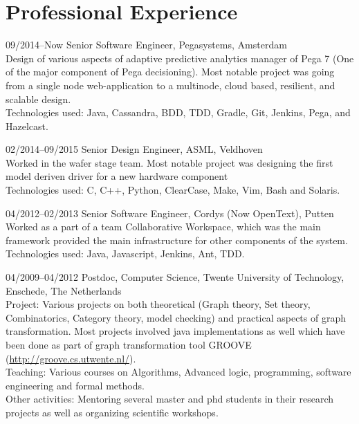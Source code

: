 \section{Professional Experience}

\begin{CV}
\item[09/2014--Now] Senior Software Engineer, Pegasystems, Amsterdam \\
Design of various aspects of adaptive predictive analytics manager of Pega 7 (One of the major component of Pega decisioning). Most notable project was going from a single node web-application to a multinode, cloud based, resilient, and scalable design. \\
Technologies used: Java, Cassandra, BDD, TDD, Gradle, Git, Jenkins, Pega, and Hazelcast.

\item[02/2014--09/2015] Senior Design Engineer, ASML, Veldhoven \\
Worked in the wafer stage team. Most notable project was designing the first model deriven driver for a new hardware component \\
Technologies used: C, C++, Python, ClearCase, Make, Vim, Bash and Solaris.

\item[04/2012--02/2013] Senior Software Engineer, Cordys (Now OpenText), Putten \\
Worked as a part of a team Collaborative Workspace, which was the main framework provided the main infrastructure for other components of the system. \\
Technologies used: Java, Javascript, Jenkins, Ant, TDD.

\item[04/2009--04/2012]Postdoc, Computer Science, Twente University of
Technology, Enschede, The Netherlands \\
\ifindustry
Project: Various projects on both theoretical (Graph theory, Set theory, Combinatorics, Category theory, model checking) and practical aspects of graph transformation. 
Most projects involved java implementations as well which have been done as part of graph transformation tool GROOVE (\url{http://groove.cs.utwente.nl/}).  \\
Teaching: Various courses on Algorithms, Advanced logic, programming, software engineering and formal methods. \\
Other activities: Mentoring several master and phd students in their research projects as well as organizing scientific workshops.
\fi


\end{CV}
